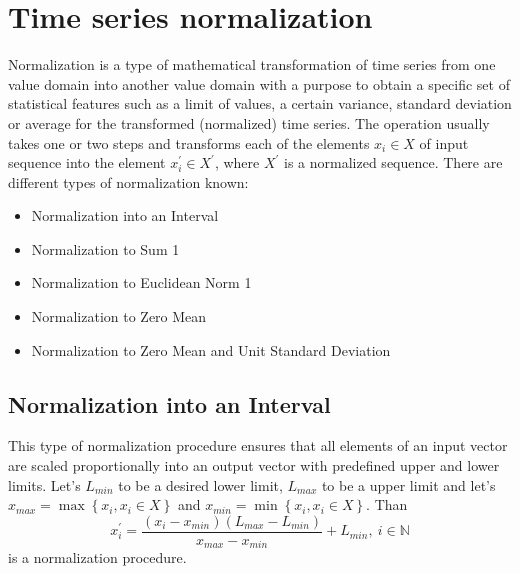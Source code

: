 \section{Time series normalization}

Normalization is a type of mathematical transformation of time series from one value domain into another value domain with a purpose to obtain a specific set of statistical features such as a limit of values, a certain variance, standard deviation or average for the transformed (normalized) time series. The operation usually takes one or two steps and transforms each of the elements $x_{i} \in X$ of input sequence into the element $x_{i}^{'} \in X^{'}$, where $X^{'}$ is a normalized sequence. There are different types of normalization known:
\begin{itemize}
	\item Normalization into an Interval \cite{citeulike:4295248} \cite{citeulike:2753031}
  \item Normalization to Sum 1
  \item Normalization to Euclidean Norm 1
  \item Normalization to Zero Mean
  \item Normalization to Zero Mean and Unit Standard Deviation \cite{citeulike:3815880}
\end{itemize}

\subsection{Normalization into an Interval}
This type of normalization procedure ensures that all elements of an input vector are scaled proportionally into an output vector with predefined upper and lower limits.
Let's $L_{min}$ to be a desired lower limit, $L_{max}$ to be a upper limit and let's $x_{max} = \max \left\{ x_{i}, x_{i} \in X \right\}$ and $x_{min} = \min \left\{ x_{i}, x_{i} \in X \right\}$. Than
\begin{equation}
x_{i}^{'} = \frac{ (x_{i}-x_{min}) (L_{max} - L_{min}) }{ x_{max} - x_{min} } + L_{min	}, \: i \in \mathbb{N}
\end{equation}
is a normalization procedure.

